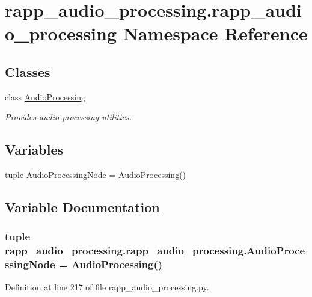 \hypertarget{namespacerapp__audio__processing_1_1rapp__audio__processing}{\section{rapp\-\_\-audio\-\_\-processing.\-rapp\-\_\-audio\-\_\-processing Namespace Reference}
\label{namespacerapp__audio__processing_1_1rapp__audio__processing}
}
\subsection*{Classes}
\begin{DoxyCompactItemize}
\item 
class \hyperlink{classrapp__audio__processing_1_1rapp__audio__processing_1_1AudioProcessing}{Audio\-Processing}
\begin{DoxyCompactList}\small\item\em Provides audio processing utilities. \end{DoxyCompactList}\end{DoxyCompactItemize}
\subsection*{Variables}
\begin{DoxyCompactItemize}
\item 
tuple \hyperlink{namespacerapp__audio__processing_1_1rapp__audio__processing_a84653cf2b197c76158dfa50ca85aae35}{Audio\-Processing\-Node} = \hyperlink{classrapp__audio__processing_1_1rapp__audio__processing_1_1AudioProcessing}{Audio\-Processing}()
\end{DoxyCompactItemize}


\subsection{Variable Documentation}
\hypertarget{namespacerapp__audio__processing_1_1rapp__audio__processing_a84653cf2b197c76158dfa50ca85aae35}{
\subsubsection[{Audio\-Processing\-Node}]{\setlength{\rightskip}{0pt plus 5cm}tuple rapp\-\_\-audio\-\_\-processing.\-rapp\-\_\-audio\-\_\-processing.\-Audio\-Processing\-Node = {\bf Audio\-Processing}()}}\label{namespacerapp__audio__processing_1_1rapp__audio__processing_a84653cf2b197c76158dfa50ca85aae35}


Definition at line 217 of file rapp\-\_\-audio\-\_\-processing.\-py.

